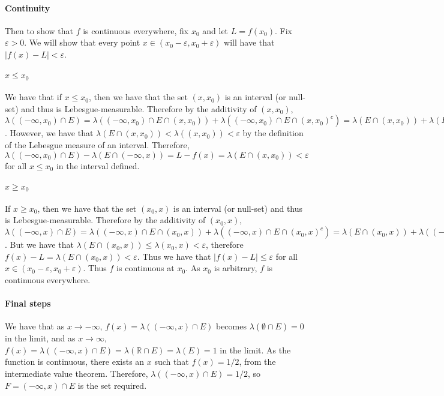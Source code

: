 \documentclass{article}
\theoremstyle{definition}
\numberwithin{theorem}{section}
\numberwithin{equation}{section}
\begin{document}
\paragraph{Continuity}
Then to show that $f$ is continuous everywhere, fix $x_0$ and let $L = f(x_0)$. Fix $\varepsilon > 0$. We will show that every point $x \in (x_0 - \varepsilon, x_0 + \varepsilon)$ will have that $|f(x) - L | < \varepsilon$. 
\paragraph{$x \leq x_0$}
We have that if $x \leq x_0$, then we have that the set $(x, x_0)$ is an interval (or null-set) and thus is Lebesgue-measurable. Therefore by the additivity of $(x, x_0)$, $\lambda((-\infty, x_0) \cap E) = \lambda((-\infty, x_0) \cap E \cap (x, x_0)) + \lambda((-\infty, x_0) \cap E \cap (x, x_0)^c) = \lambda(E \cap (x, x_0)) + \lambda(E \cap (-\infty, x))$. However, we have that $\lambda(E \cap (x, x_0)) < \lambda((x, x_0)) < \varepsilon$ by the definition of the Lebesgue measure of an interval. Therefore, $\lambda((-\infty, x_0) \cap E) - \lambda(E \cap (-\infty, x)) = L - f(x) = \lambda(E \cap (x, x_0)) < \varepsilon$ for all $x \leq x_0$ in the interval defined.
\paragraph{$x \geq x_0$}
If $x \geq x_0$, then we have that the set $(x_0, x)$ is an interval (or null-set) and thus is Lebesgue-measurable. Therefore by the additivity of $(x_0, x)$, $\lambda((-\infty, x) \cap E) =  \lambda((-\infty, x) \cap E \cap (x_0, x)) + \lambda((-\infty, x) \cap E \cap (x_0, x)^c) = \lambda(E \cap (x_0, x)) + \lambda((-\infty, x_0) \cap E)$. But we have that $\lambda(E \cap (x_0, x)) \leq \lambda(x_0, x) < \varepsilon$, therefore $f(x) - L = \lambda(E \cap (x_0, x)) < \varepsilon$. Thus we have that $|f(x) - L| \leq \varepsilon$ for all $x \in (x_0 - \varepsilon, x_0 + \varepsilon)$. Thus $f$ is continuous at $x_0$. As $x_0$ is arbitrary, $f$ is continuous everywhere.
\paragraph{Final steps}
We have that as $x \rightarrow -\infty$, $f(x) = \lambda((-\infty, x) \cap E)$ becomes $\lambda(\emptyset \cap E) = 0$ in the limit, and as $x \rightarrow \infty$, $f(x) = \lambda((-\infty, x) \cap E) = \lambda(\mathbb{R} \cap E) = \lambda(E) = 1$ in the limit. As the function is continuous, there exists an $x$ such that $f(x) = 1/2$, from the intermediate value theorem. Therefore, $\lambda((-\infty, x) \cap E) = 1/2$, so $F = (-\infty, x) \cap E$ is the set required.
\end{document}
